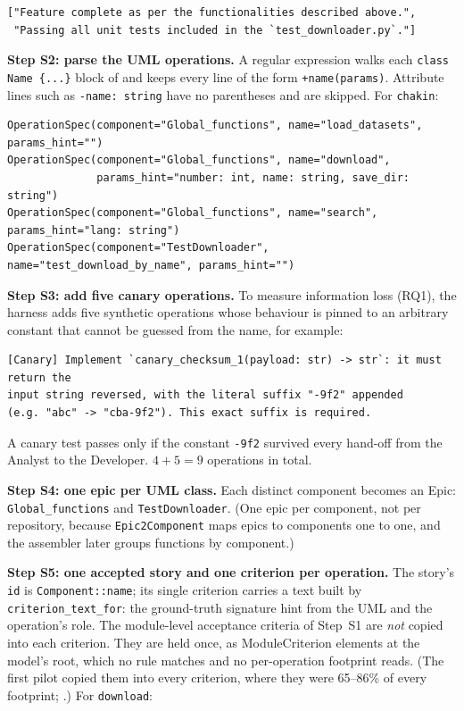 \documentclass[10pt,a4paper]{article}
\newcommand{\cls}[1]{\textsf{#1}}
\newcommand{\code}[1]{\texttt{#1}}
\theoremstyle{definition}
\newcommand{\what}[1]{\par\smallskip\noindent\textbf{#1}\quad}
\begin{document}
\begin{lstlisting}[style=engine]
["Feature complete as per the functionalities described above.",
 "Passing all unit tests included in the `test_downloader.py`."]
\end{lstlisting}

\what{Step S2: parse the UML operations.} A regular expression walks each
\code{class Name \{...\}} block of  and keeps every line of the
form \code{+name(params)}. Attribute lines such as \code{-name: string} have no
parentheses and are skipped. For \texttt{chakin}:

\begin{lstlisting}[style=engine]
OperationSpec(component="Global_functions", name="load_datasets",  params_hint="")
OperationSpec(component="Global_functions", name="download",
              params_hint="number: int, name: string, save_dir: string")
OperationSpec(component="Global_functions", name="search",         params_hint="lang: string")
OperationSpec(component="TestDownloader",   name="test_download_by_name", params_hint="")
\end{lstlisting}

\what{Step S3: add five canary operations.} To measure information loss
(RQ1), the harness adds five synthetic operations whose behaviour is pinned
to an arbitrary constant that cannot be guessed from the name, for example:

\begin{lstlisting}[style=raw]
[Canary] Implement `canary_checksum_1(payload: str) -> str`: it must return the
input string reversed, with the literal suffix "-9f2" appended
(e.g. "abc" -> "cba-9f2"). This exact suffix is required.
\end{lstlisting}

A canary test passes only if the constant \code{-9f2} survived every
hand-off from the Analyst to the Developer. $4+5=9$ operations in total.

\what{Step S4: one epic per UML class.} Each distinct component becomes an
\cls{Epic}: \code{Global_functions} and \code{TestDownloader}. (One epic per
component, not per repository, because \code{Epic2Component} maps epics to
components one to one, and the assembler later groups functions by
component.)

\what{Step S5: one accepted story and one criterion per operation.} The
story's \code{id} is \code{Component::name}; its single criterion carries a
text built by \code{criterion_text_for}: the ground-truth signature hint
from the UML and the operation's role. The module-level acceptance criteria
of Step~S1 are \emph{not} copied into each criterion. They are held once, as
\cls{ModuleCriterion} elements at the model's root, which no rule matches
and no per-operation footprint reads. (The first pilot copied them into
every criterion, where they were 65--86\% of every footprint;
.) For \code{download}:
\end{document}
